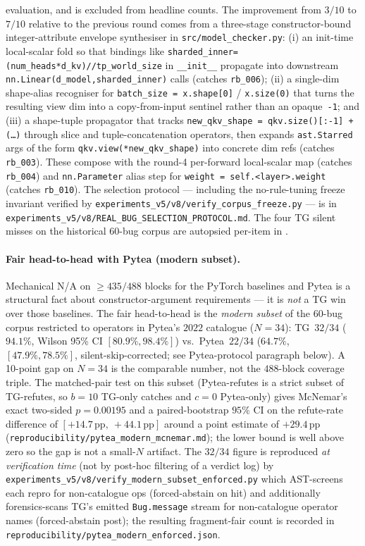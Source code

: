 evaluation, and is excluded from headline counts.
The improvement from $3/10$ to $7/10$ relative to the
previous round comes from a three-stage constructor-bound
integer-attribute envelope synthesiser in
\texttt{src/model\_checker.py}: (i) an init-time local-scalar
fold so that bindings like
\texttt{sharded\_inner=(num\_heads*d\_kv)//tp\_world\_size}
in \texttt{\_\_init\_\_} propagate into downstream
\texttt{nn.Linear(d\_model,sharded\_inner)} calls (catches
\texttt{rb\_006}); (ii) a single-dim shape-alias recogniser for
\texttt{batch\_size = x.shape[0]} / \texttt{x.size(0)} that
turns the resulting view dim into a copy-from-input sentinel
rather than an opaque~\texttt{-1}; and (iii) a shape-tuple
propagator that tracks
\texttt{new\_qkv\_shape = qkv.size()[:-1] + (\dots)} through
slice and tuple-concatenation operators, then expands
\texttt{ast.Starred} args of the form
\texttt{qkv.view(*new\_qkv\_shape)} into concrete dim refs
(catches \texttt{rb\_003}).  These compose with the round-4
per-forward local-scalar map (catches \texttt{rb\_004})
and \texttt{nn.Parameter} alias step for
\texttt{weight = self.<layer>.weight} (catches \texttt{rb\_010}).  The selection
protocol --- including the no-rule-tuning
freeze invariant verified by
\texttt{experiments\_v5/v8/verify\_corpus\_freeze.py} --- is in
\texttt{experiments\_v5/v8/REAL\_BUG\_SELECTION\_PROTOCOL.md}.
The four \textsc{TG} silent misses on the historical $60$-bug
corpus are autopsied per-item in .

\paragraph{Fair head-to-head with Pytea (modern subset).}
Mechanical \textsc{N/A} on $\ge 435/488$ blocks for the
PyTorch baselines and Pytea is a structural fact about
constructor-argument requirements --- it is \emph{not} a TG win
over those baselines. The fair head-to-head is the
\emph{modern subset} of the $60$-bug corpus restricted to
operators in Pytea's $2022$ catalogue ($N{=}34$):
\textsc{TG}~$32/34$ ($94.1\%$, Wilson 95\% CI $[80.9\%, 98.4\%]$)
vs.\ Pytea~$22/34$
($64.7\%$, $[47.9\%, 78.5\%]$, silent-skip-corrected; see Pytea-protocol
paragraph below). A 10-point gap on $N{=}34$ is the comparable
number, not the $488$-block coverage triple.  The matched-pair
test on this subset (Pytea-refutes is a strict subset of
TG-refutes, so $b{=}10$ TG-only catches and $c{=}0$ Pytea-only)
gives McNemar's exact two-sided $p{=}0.00195$ and a
paired-bootstrap $95\%$ CI on the refute-rate difference of
$[{+}14.7\,\text{pp},\ {+}44.1\,\text{pp}]$ around a point
estimate of $+29.4\,\text{pp}$
(\texttt{reproducibility/pytea\_modern\_mcnemar.md}); the lower
bound is well above zero so the gap is not a small-$N$ artifact.
The
$32/34$ figure is reproduced \emph{at verification time}
(not by post-hoc filtering of a verdict log) by
\texttt{experiments\_v5/v8/verify\_modern\_subset\_enforced.py}
which AST-screens each repro for non-catalogue ops
(forced-abstain on hit) and additionally forensics-scans
TG's emitted \texttt{Bug.message} stream for non-catalogue
operator names (forced-abstain post); the resulting
fragment-fair count is recorded in
\texttt{reproducibility/pytea\_modern\_enforced.json}.

